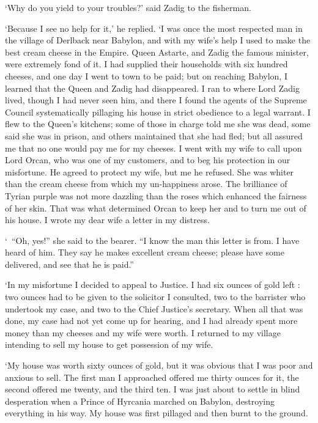 \documentclass{article}
\begin{document}
\begin{center}
`Why do you yield to your troubles?' said Zadig to the fisherman. 

`Because I see no help for it,' he replied. `I was once the most respected man 
in the village of Derlback near Babylon, and with my wife's help I used to make 
the best cream cheese in the Empire. Queen Astarte, and Zadig the famous minister, 
were extremely fond of it. I had supplied their households with six hundred cheeses, 
and one day I went to town to be paid; but on reaching Babylon, I learned that 
the Queen and Zadig had disappeared. I ran to where Lord Zadig lived, though I 
had never seen him, and there I found the agents of the Supreme Council systematically 
pillaging his house in strict obedience to a legal warrant. I flew to the Queen's 
kitchens; some of those in charge told me she was dead, some said she was in prison, 
and others maintained that she had fled; but all assured me that no one would pay 
me for my cheeses. I went with my wife to call upon Lord Orcan, who was one of 
my customers, and to beg his protection in our misfortune. He agreed to protect 
my wife, but me he refused. She was whiter than the cream cheese from which my 
un-happiness arose. The brilliance of Tyrian purple was not more dazzling than 
the roses which enhanced the fairness of her skin. That was what determined Orcan 
to keep her and to turn me out of his house. I wrote my dear wife a letter in my 
distress. 

`~``Oh, yes!'' she said to the bearer. ``I know the man this letter is from. I 
have heard of him. They say he makes excellent cream cheese; please have some delivered, 
and see that he is paid.'' 

`In my misfortune I decided to appeal to Justice. I had six ounces of gold left 
: two ounces had to be given to the solicitor I consulted, two to the barrister 
who undertook my case, and two to the Chief Justice's secretary. When all that 
was done, my case had not yet come up for hearing, and I had already spent more 
money than my cheeses and my wife were worth. I returned to my village intending 
to sell my house to get possession of my wife. 

`My house was worth sixty ounces of gold, but it was obvious that I was poor and 
anxious to sell. The first man I approached offered me thirty ounces for it, the 
second offered me twenty, and the third ten. I was just about to settle in blind 
desperation when a Prince of Hyrcania marched on Babylon, destroying everything 
in his way. My house was first pillaged and then burnt to the ground. 


\end{center}
\end{document}
